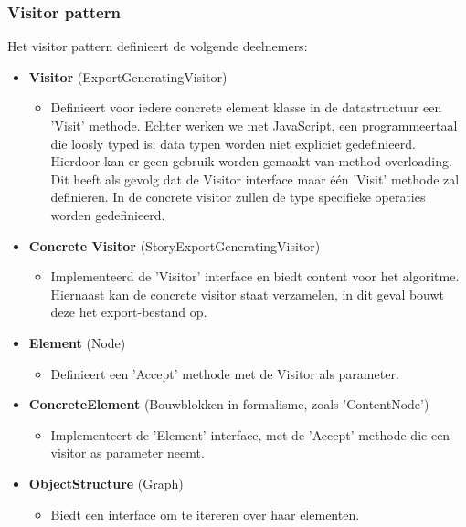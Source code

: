 \subsubsection{Visitor pattern}
Het visitor pattern definieert de volgende deelnemers:

\begin{itemize}
    \item \textbf{Visitor} (ExportGeneratingVisitor)
    \begin{itemize}
        \item Definieert voor iedere concrete element klasse in de datastructuur een 'Visit' methode. Echter werken we met JavaScript, een programmeertaal die loosly typed is; data typen worden niet expliciet gedefinieerd. Hierdoor kan er geen gebruik worden gemaakt van method overloading. Dit heeft als gevolg dat de Visitor interface maar één 'Visit' methode zal definieren. In de concrete visitor zullen de type specifieke operaties worden gedefinieerd.
    \end{itemize}

    \item \textbf{Concrete Visitor} (StoryExportGeneratingVisitor)
    \begin{itemize}
        \item Implementeerd de 'Visitor' interface en biedt content voor het algoritme. Hiernaast kan de concrete visitor staat verzamelen, in dit geval bouwt deze het export-bestand op.
    \end{itemize}

    \item \textbf{Element} (Node)
    \begin{itemize}
        \item Definieert een 'Accept' methode met de Visitor als parameter.
    \end{itemize}

    \item \textbf{ConcreteElement} (Bouwblokken in formalisme, zoals 'ContentNode')
    \begin{itemize}
        \item Implementeert de 'Element' interface, met de 'Accept' methode die een visitor as parameter neemt.
    \end{itemize}

    \item \textbf{ObjectStructure} (Graph)
    \begin{itemize}
        \item Biedt een interface om te itereren over haar elementen.
    \end{itemize}
\end{itemize}

